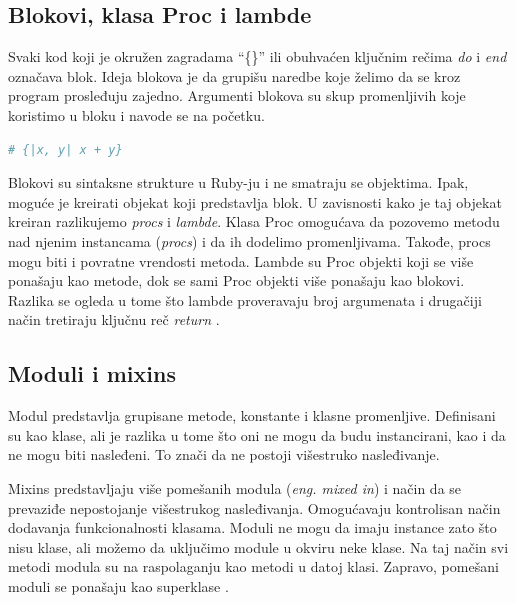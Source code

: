 \documentclass[a4paper]{article}
\begin{document}
\subsection{Blokovi, klasa Proc i lambde}
Svaki kod koji je okružen zagradama “\{\}” ili obuhvaćen ključnim rečima \emph{do} i \emph{end} označava blok. Ideja blokova je da grupišu naredbe koje želimo da se kroz program prosleđuju zajedno. Argumenti blokova su skup promenljivih koje koristimo u bloku i navode se na početku.
\begin{lstlisting}[language=Ruby]
	# {|x, y| x + y}
\end{lstlisting}\vspace*{-15pt}

Blokovi su sintaksne strukture u Ruby-ju i ne smatraju se objektima. Ipak, moguće je kreirati objekat koji predstavlja blok. U zavisnosti kako je taj objekat kreiran razlikujemo \emph{procs} i \emph{lambde}. Klasa Proc omogućava da pozovemo metodu nad njenim instancama (\emph{procs}) i da ih dodelimo promenljivama. Takođe, procs mogu biti i povratne vrendosti metoda. Lambde su Proc objekti koji se više ponašaju kao metode, dok se sami Proc objekti više ponašaju kao blokovi. Razlika se ogleda u tome što lambde proveravaju broj argumenata i drugačiji način tretiraju ključnu reč \emph{return} \cite{rubyProgLang}.

\subsection{Moduli i mixins}
Modul predstavlja grupisane metode, konstante i klasne promenljive. Definisani su kao klase, ali je razlika u tome što oni ne mogu da budu instancirani, kao i da ne mogu biti nasleđeni. To znači da ne postoji višestruko nasleđivanje.

Mixins predstavljaju više pomešanih modula (\emph{eng. mixed in}) i način da se prevaziđe nepostojanje višestrukog nasleđivanja. Omogućavaju kontrolisan način dodavanja funkcionalnosti klasama. Moduli ne mogu da imaju instance zato što nisu klase, ali možemo da uključimo module u okviru neke klase. Na taj način svi metodi modula su na raspolaganju kao metodi u datoj klasi. Zapravo, pomešani moduli se ponašaju kao superklase \cite{ruby-doc}.
\end{document}
